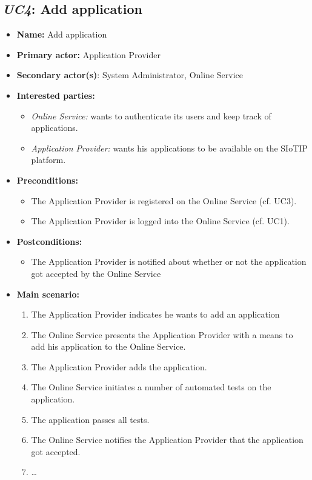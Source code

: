 \documentclass[english,peerreview]{sareport}
\begin{document}
\subsection{\emph{UC4}: Add application}
\begin{itemize}
    \item \textbf{Name:} Add application
    \item \textbf{Primary actor:} Application Provider
    \item \textbf{Secondary actor(s)}: System Administrator, Online Service
    \item \textbf{Interested parties:} 
        \begin{itemize}
            \item \textit{Online Service:} wants to authenticate its users and keep track of applications.
            \item \textit{Application Provider:} wants his applications to be available on the SIoTIP platform.
        \end{itemize}

    \item \textbf{Preconditions:}
        \begin{itemize}
            \item The Application Provider is registered on the Online Service (cf. UC3).
            \item The Application Provider is logged into the Online Service (cf. UC1).
        \end{itemize}

    \item \textbf{Postconditions:}
        \begin{itemize}
            \item The Application Provider is notified about whether or not the application got accepted by the Online Service
        \end{itemize}
        
    \item \textbf{Main scenario:} 
    \begin{enumerate}
       \item The Application Provider indicates he wants to add an application
       \item The Online Service presents the Application Provider with a means to add his application to the Online Service.
       \item The Application Provider adds the application.
	\item The Online Service initiates a number of automated tests on the application.
	\item The application passes all tests.
	\item The Online Service notifies the Application Provider that the application got accepted.
       \item \ldots
    \end{enumerate}


\end{itemize}
\end{document}
